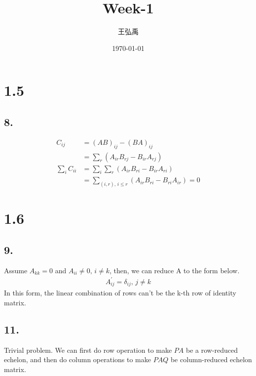 \documentclass[12pt, a4paper]{article}
\title{\textbf{Week-1}}
\author{王弘禹}
\date\today
\begin{document}
\begin{CJK*}{UTF8}{bsmi}
\linespread{1.5}
\maketitle
\newcommand{\st}[1]{\section*{#1}}
\newcommand{\sst}[1]{\subsection*{#1}}
\newcommand{\ssst}[1]{\subsubsection*{#1}}
\newcommand{\dsp}{\displaystyle}
\newcommand{\dx}{\,dx}
\newcommand{\dphi}{\,d\phi}
\newcommand{\dtheta}{\,d\theta}
\newcommand{\dy}{\,dy}
\newcommand{\dz}{\,dz}
\newcommand{\dr}{\,dr}
\newcommand{\drho}{\,d\rho}
\newcommand{\tb}{\textbf}
\st{1.5}
\sst{8.}
\begin{align}
    C_{ij} &= {(AB)}_{ij} - {(BA)}_{ij}\\
    &= \sum_r (A_{ir}B_{rj} - B_{ir}A_{rj})\\
    \sum_i C_{ii} &= \sum_i\sum_r (A_{ir}B_{ri} - B_{ir}A_{ri})\\
    &= \sum_{(i,r),\, i\le r}(A_{ir}B_{ri}-B_{ri}A_{ir})=0
\end{align}
\st{1.6}
\sst{9.}
Assume \(A_{kk}=0\) and \(A_{ii}\neq 0,\,i\neq k\), then, we can reduce A to the form below.
\begin{align}
    A^\prime_{ij} = \delta_{ij},\, j\neq k
\end{align}
In this form, the linear combination of rows can't be the k-th row of identity matrix.
\sst{11.}
Trivial problem. We can first do row operation to make \(PA\) be a row-reduced echelon, and then do column operations to make \(PAQ\) be column-reduced echelon matrix.
\end{CJK*}
\end{document}
